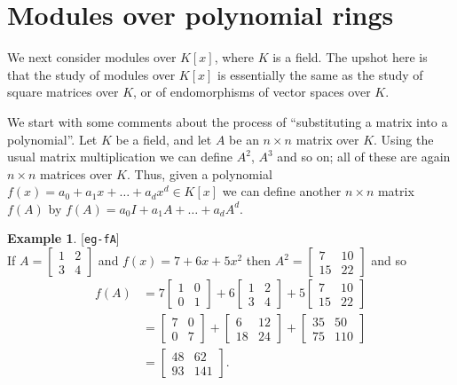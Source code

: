 \documentclass{amsart}
\newcommand{\lbl}[1]{\label{#1}\textup{[\texttt{#1}]}\ \\}
\newcommand{\lbl}{\label}
\newcommand{\bsm}       {\left[\begin{smallmatrix}}
\newcommand{\esm}       {\end{smallmatrix}\right]}
\newcommand{\tm}        {\times}
\renewcommand{\:}{\colon}
\theoremstyle{definition}
\newtheorem{example}[theorem]{Example}
\begin{document}
\section{Modules over polynomial rings}
\label{sec-poly-modules}

We next consider modules over $K[x]$, where $K$ is a field.  The
upshot here is that the study of modules over $K[x]$ is essentially
the same as the study of square matrices over $K$, or of endomorphisms
of vector spaces over $K$.

We start with some comments about the process of ``substituting a
matrix into a polynomial''.  Let $K$ be a field, and let $A$ be an
$n\tm n$ matrix over $K$.  Using the usual matrix multiplication we
can define $A^2$, $A^3$ and so on; all of these are again $n\tm n$
matrices over $K$.  Thus, given a polynomial
$f(x)=a_0+a_1x+\ldots+a_dx^d\in K[x]$ we can define another $n\tm n$
matrix $f(A)$ by $f(A)=a_0I+a_1A+\ldots+a_dA^d$.
\begin{example}\lbl{eg-fA}
 If $A=\bsm 1&2\\3 &4\esm$ and $f(x)=7+6x+5x^2$ then
 $A^2=\bsm 7&10\\ 15&22\esm$ and so
 \begin{align*}
  f(A) &= 7\bsm 1&0\\0&1 \esm +
          6\bsm 1&2\\3&4 \esm +
          5\bsm 7&10\\15&22 \esm \\
       &= \bsm 7&0\\0&7\esm +
          \bsm 6&12\\18&24\esm +
          \bsm 35&50\\75&110\esm \\
       &= \bsm 48&62\\93&141\esm.
 \end{align*}
\end{example}
\end{document}
